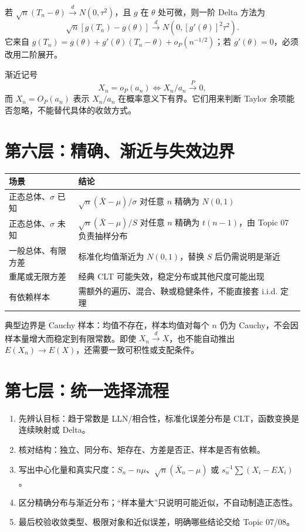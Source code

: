 \documentclass[11pt,a4paper]{ctexart}
\begin{document}
若 $\sqrt n(T_n-\theta)\xrightarrow{d}N(0,\tau^2)$，且 $g$ 在 $\theta$ 处可微，则一阶 Delta 方法为
\[
\boxed{\sqrt n[g(T_n)-g(\theta)]\xrightarrow{d}N(0,[g'(\theta)]^2\tau^2)}.
\]
它来自 $g(T_n)=g(\theta)+g'(\theta)(T_n-\theta)+o_P(n^{-1/2})$；若 $g'(\theta)=0$，必须改用二阶展开。

渐近记号
\[
X_n=o_P(a_n)\iff X_n/a_n\xrightarrow{P}0,
\]
而 $X_n=O_P(a_n)$ 表示 $X_n/a_n$ 在概率意义下有界。它们用来判断 Taylor 余项能否忽略，不能替代具体的收敛方式。

\section{第六层：精确、渐近与失效边界}

\begin{center}
\begin{tabularx}{\linewidth}{L{4.2cm}Y}
\toprule
场景 & 结论\\
\midrule
正态总体、$\sigma$ 已知 & $\sqrt n(\bar X-\mu)/\sigma$ 对任意 $n$ 精确为 $N(0,1)$\\
正态总体、$\sigma$ 未知 & $\sqrt n(\bar X-\mu)/S$ 对任意 $n$ 精确为 $t(n-1)$，由 Topic 07 负责抽样分布\\
一般总体、有限方差 & 标准化均值渐近为 $N(0,1)$，替换 $S$ 后仍需说明是渐近\\
重尾或无限方差 & 经典 CLT 可能失效，稳定分布或其他尺度可能出现\\
有依赖样本 & 需额外的遍历、混合、鞅或稳健条件，不能直接套 i.i.d. 定理\\
\bottomrule
\end{tabularx}
\end{center}

典型边界是 Cauchy 样本：均值不存在，样本均值对每个 $n$ 仍为 Cauchy，不会因样本量增大而稳定到有限常数。即使 $X_n\xrightarrow{d}X$，也不能自动推出 $E(X_n)\to E(X)$，还需要一致可积性或支配条件。

\section{第七层：统一选择流程}

\begin{enumerate}
  \item 先辨认目标：趋于常数是 LLN/相合性，标准化误差分布是 CLT，函数变换是连续映射或 Delta。
  \item 核对结构：独立、同分布、矩存在、方差是否正、样本是否有依赖。
  \item 写出中心化量和真实尺度：$S_n-n\mu$、$\sqrt n(\bar X_n-\mu)$ 或 $s_n^{-1}\sum(X_i-EX_i)$。
  \item 区分精确分布与渐近分布；“样本量大”只说明可能近似，不自动制造正态性。
  \item 最后校验收敛类型、极限对象和近似误差，明确哪些结论交给 Topic 07/08。
\end{enumerate}
\end{document}

